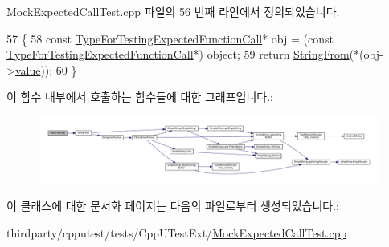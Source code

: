 Mock\+Expected\+Call\+Test.\+cpp 파일의 56 번째 라인에서 정의되었습니다.


\begin{DoxyCode}
57     \{
58         \textcolor{keyword}{const} \hyperlink{class_type_for_testing_expected_function_call}{TypeForTestingExpectedFunctionCall}* obj = (\textcolor{keyword}{const} 
      \hyperlink{class_type_for_testing_expected_function_call}{TypeForTestingExpectedFunctionCall}*) \textcolor{keywordtype}{object};
59         \textcolor{keywordflow}{return} \hyperlink{_simple_string_8h_a195ee4ca8d909f9ebf37e963d4564446}{StringFrom}(*(obj->\hyperlink{class_type_for_testing_expected_function_call_a1f383aee95bb3864942bbeb7416cbcad}{value}));
60     \}
\end{DoxyCode}


이 함수 내부에서 호출하는 함수들에 대한 그래프입니다.\+:
\nopagebreak
\begin{figure}[H]
\begin{center}
\leavevmode
\includegraphics[width=350pt]{class_type_for_testing_expected_function_call_comparator_ac1977e0f262ffd2668247d9b3c565722_cgraph}
\end{center}
\end{figure}




이 클래스에 대한 문서화 페이지는 다음의 파일로부터 생성되었습니다.\+:\begin{DoxyCompactItemize}
\item 
thirdparty/cpputest/tests/\+Cpp\+U\+Test\+Ext/\hyperlink{_mock_expected_call_test_8cpp}{Mock\+Expected\+Call\+Test.\+cpp}\end{DoxyCompactItemize}

